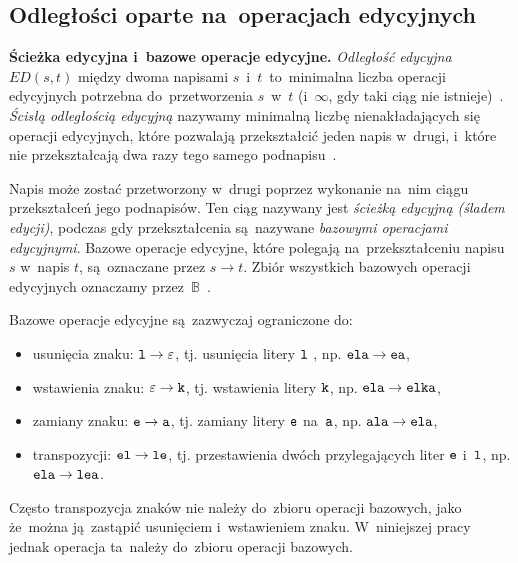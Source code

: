 \documentclass{praca1}
\begin{document}
\subsection{Odległości oparte na~operacjach edycyjnych}

\textbf{Ścieżka edycyjna i~bazowe operacje edycyjne.} \emph{Odległość edycyjna} $ED(s,t)$ między dwoma napisami $s$~i~$t$~to~minimalna liczba operacji edycyjnych potrzebna do~przetworzenia $s$~w~$t$ (i~$\infty$, gdy taki ciąg nie istnieje)~\cite{Navarro2001:guidedtour}. \emph{Ścisłą odległością edycyjną} nazywamy minimalną liczbę nienakładających się operacji edycyjnych, które pozwalają przekształcić jeden napis w~drugi, i~które nie przekształcają dwa razy tego samego podnapisu~\cite{Boytsov2011:indexingmethods}.

Napis może zostać przetworzony w~drugi poprzez wykonanie na~nim ciągu przekształceń jego podnapisów. Ten ciąg nazywany jest \emph{ścieżką edycyjną (śladem edycji)}, podczas gdy przekształcenia są~nazywane \emph{bazowymi operacjami edycyjnymi}. Bazowe operacje edycyjne, które polegają na~przekształceniu napisu $s$ w~napis $t$, są~oznaczane przez $s \rightarrow t$. Zbiór wszystkich bazowych operacji edycyjnych oznaczamy przez~$\mathbb{B}$~\cite{Boytsov2011:indexingmethods}. 


Bazowe operacje edycyjne są~zazwyczaj ograniczone do:
\begin{itemize}
\item usunięcia znaku: $\verb|l| \rightarrow \varepsilon$, tj. usunięcia litery $\verb|l|$ , np. $\verb|ela| \rightarrow \verb|ea|$,
\item wstawienia znaku: $\varepsilon \rightarrow \verb|k|$, tj. wstawienia litery $\verb|k|$, np. $\verb|ela| \rightarrow \verb|elka|$,
\item zamiany znaku: $\verb|e| \rightarrow \verb|a|$, tj. zamiany litery $\verb|e|$ na~$\verb|a|$, np. $\verb|ala| \rightarrow \verb|ela|$,
\item transpozycji: $\verb|el| \rightarrow \verb|le|$, tj. przestawienia dwóch przylegających liter $\verb|e|$ i~$\verb|l|$, np. $\verb|ela| \rightarrow \verb|lea|$.
\end{itemize}

Często transpozycja znaków nie należy do~zbioru operacji bazowych, jako że~można ją~zastąpić usunięciem i~wstawieniem znaku. W~niniejszej pracy jednak operacja ta~należy do~zbioru operacji bazowych.

\end{document}
